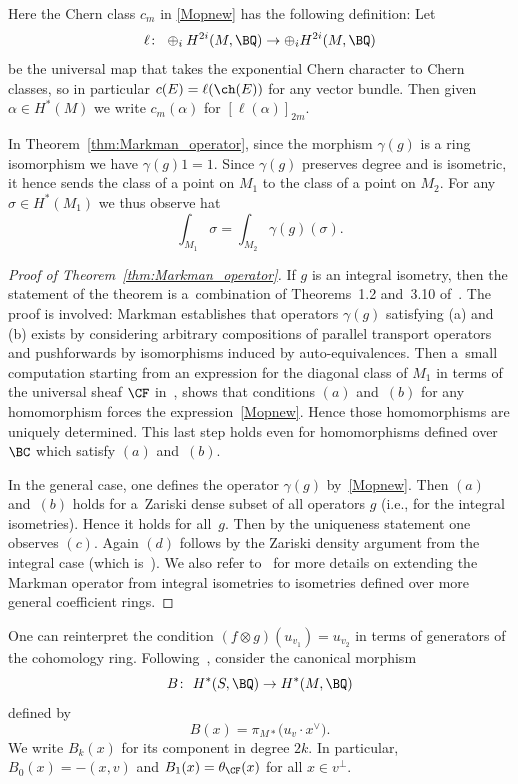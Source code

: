 \begin{rmk} \label{rmk: c applied to coh class}
Here the Chern class $c_m$ in \eqref{Mopnew} has the following definition:
Let
\[
\ell \colon \ \oplus_i H^{2i}(M,\BQ) \to \oplus_i H^{2i}(M,\BQ)
\]
be the universal map that takes the exponential Chern character to Chern classes,
so in particular $c(E) = \ell( \ch(E) )$ for any vector bundle.
Then given $\alpha \in H^{\ast}(M)$ we write $c_m(\alpha)$ for $\left[ \ell(\alpha) \right]_{2m}$.
\end{rmk}

\begin{rmk}
In Theorem~\ref{thm:Markman_operator}, since the morphism $\gamma(g)$ is a ring isomorphism we have $\gamma(g)1 = 1$. Since $\gamma(g)$ preserves degree and is isometric,
it hence sends the class of a point on $M_1$ to the class of a point on $M_2$. For any $\sigma \in H^{\ast}(M_1)$ we thus observe hat
\[ \int_{M_1} \sigma = \int_{M_2} \gamma(g)(\sigma). \]
\end{rmk}

\begin{proof}[Proof of Theorem~\ref{thm:Markman_operator}]
If $g$ is an integral isometry, then the
statement of the theorem is a~combination
of Theorems~1.2 and~3.10 of~\cite{Markman}.
The proof is involved: Markman establishes that operators $\gamma(g)$ satisfying (a) and (b) exists
by considering arbitrary compositions of parallel transport operators and pushforwards by isomorphisms induced by auto-equivalences.
Then a~small computation starting from an expression for the diagonal class of $M_1$ in terms of the universal sheaf $\CF$ in~\cite{MarkmanGenerators},
shows that conditions $(a)$ and~$(b)$ for any homomorphism forces the expression~\eqref{Mopnew}.
Hence those homomorphisms are uniquely determined.
This last step holds even for homomorphisms defined over $\BC$ which satisfy $(a)$ and~$(b)$.

In the general case, one defines the operator $\gamma(g)$ by~\eqref{Mopnew}.
Then $(a)$ and~$(b)$ holds for a~Zariski dense subset of all operators $g$ (i.e., for the integral isometries).
Hence it holds for all~$g$. Then by the uniqueness statement one observes $(c)$. Again $(d)$ follows by the Zariski density argument from the integral case
(which is~\cite[Theorem~1.2(6)]{Markman}).
We also refer to~\cite[Proposition 5.1]{Frei} for more details on extending the Markman operator from integral isometries to isometries defined over more general coefficient rings.
\end{proof}
One can reinterpret the condition $(f \otimes g)(u_{v_1}) = u_{v_2}$ in terms of generators of the cohomology ring.
Following~\cite[equation~(3.23)]{Markman}, consider the canonical morphism
\[
B \colon \ H^{\ast}(S,\BQ) \to H^{\ast}(M,\BQ)
\]
defined by
\[
B(x) = \pi_{M \ast}\big( u_{v} \cdot x^{\vee} \big).
\]
We write $B_k(x)$ for its component in degree $2k$. In particular,
$B_0(x) = -(x,v)$ and
$B_1(x) = \theta_{\CF}(x)$ for all $x \in v^{\perp}$.


